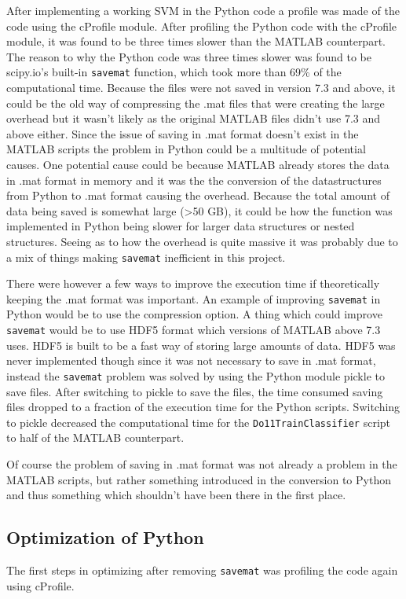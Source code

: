 \documentclass[12pt, a4paper]{article}
\begin{document}
After implementing a working SVM in the Python code a profile was made of the code using the cProfile module.
After profiling the Python code with the cProfile module, it was found to be three times slower than the MATLAB counterpart.
The reason to why the Python code was three times slower was found to be scipy.io's built-in \texttt{savemat} function, which took more than 69\% of the computational time.
Because the files were not saved in version 7.3 and above, it could be the old way of compressing the .mat files that were creating the large overhead but it wasn't likely as the original MATLAB files didn't use 7.3 and above either.
Since the issue of saving in .mat format doesn't exist in the MATLAB scripts the problem in Python could be a multitude of potential causes.
One potential cause could be because MATLAB already stores the data in .mat format in memory and it was the the conversion of the datastructures from Python to .mat format causing the overhead.
Because the total amount of data being saved is somewhat large (>50 GB), it could be how the function was implemented in Python being slower for larger data structures or nested structures. 
Seeing as to how the overhead is quite massive it was probably due to a mix of things making \texttt{savemat} inefficient in this project.

There were however a few ways to improve the execution time if theoretically keeping the .mat format was important.
An example of improving \texttt{savemat} in Python would be to use the compression option.
A thing which could improve \texttt{savemat} would be to use HDF5 format which versions of MATLAB above 7.3 uses. 
HDF5 is built to be a fast way of storing large amounts of data.
HDF5 was never implemented though since it was not necessary to save in .mat format, instead the \texttt{savemat} problem was solved by using the Python module pickle to save files.
After switching to pickle to save the files, the time consumed saving files dropped to a fraction of the execution time for the Python scripts.
Switching to pickle decreased the computational time for the \texttt{Do11TrainClassifier} script to half of the MATLAB counterpart. %

Of course the problem of saving in .mat format was not already a problem in the MATLAB scripts, but rather something introduced in the conversion to Python and thus something which shouldn't have been there in the first place.

\subsection{Optimization of Python}
The first steps in optimizing after removing \texttt{savemat} was profiling the code again using cProfile.
\end{document}
